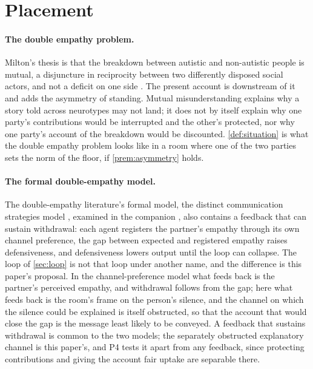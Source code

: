 \section{Placement}\label{sec:placement}

\paragraph{The double empathy problem.} Milton's thesis is that the breakdown between autistic and non-autistic people is mutual, a disjuncture in reciprocity between two differently disposed social actors, and not a deficit on one side \cite{Milton2012}. The present account is downstream of it and adds the asymmetry of standing. Mutual misunderstanding explains why a story told across neurotypes may not land; it does not by itself explain why one party's contributions would be interrupted and the other's protected, nor why one party's account of the breakdown would be discounted. \autoref{def:situation} is what the double empathy problem looks like in a room where one of the two parties sets the norm of the floor, if \autoref{prem:asymmetry} holds.

\paragraph{The formal double-empathy model.} The double-empathy literature's formal model, the distinct communication strategies model \cite{Calderoli2026}, examined in the companion \cite{NormCost}, also contains a feedback that can sustain withdrawal: each agent registers the partner's empathy through its own channel preference, the gap between expected and registered empathy raises defensiveness, and defensiveness lowers output until the loop can collapse. The loop of \autoref{sec:loop} is not that loop under another name, and the difference is this paper's proposal. In the channel-preference model what feeds back is the partner's perceived empathy, and withdrawal follows from the gap; here what feeds back is the room's frame on the person's silence, and the channel on which the silence could be explained is itself obstructed, so that the account that would close the gap is the message least likely to be conveyed. A feedback that sustains withdrawal is common to the two models; the separately obstructed explanatory channel is this paper's, and P4 tests it apart from any feedback, since protecting contributions and giving the account fair uptake are separable there.

